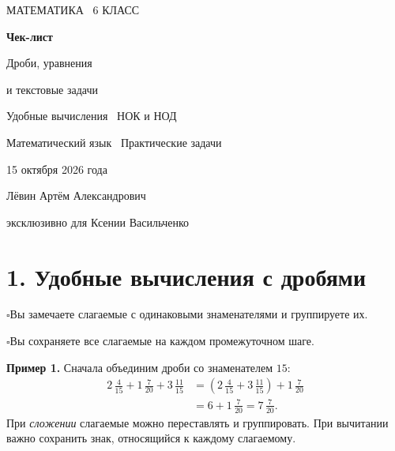 \documentclass[a4paper,12pt]{article}
\newcommand{\sectionline}[1]{\section*{\color{darkaccent}#1}}
\newcommand{\learn}[1]{\par\noindent$\square$\enspace #1\par}
\newcommand{\mix}[3]{#1\,\frac{#2}{#3}}
\begin{document}
\begin{titlepage}
\thispagestyle{empty}
\centering
\vspace*{30mm}
{\color{accent}\large МАТЕМАТИКА \textbullet\ 6 КЛАСС\par}
\vspace{18mm}
{\color{darkaccent}\Huge\bfseries Чек-лист\par}
\vspace{9mm}
{\LARGE Дроби, уравнения\par}
\vspace{2mm}
{\LARGE и текстовые задачи\par}
\vspace{11mm}
{\large Удобные вычисления \textbullet\ НОК и НОД\par}
\vspace{2mm}
{\large Математический язык \textbullet\ Практические задачи\par}
\vspace{18mm}
{\large 15 октября 2026 года\par}
\vfill
{\large Лёвин Артём Александрович\par}
\vspace{3mm}
{\normalsize эксклюзивно для Ксении Васильченко\par}
\vspace{32mm}
\end{titlepage}

\sectionline{1. Удобные вычисления с дробями}
\learn{Вы замечаете слагаемые с одинаковыми знаменателями и группируете их.}
\learn{Вы сохраняете все слагаемые на каждом промежуточном шаге.}

\textbf{Пример 1.} Сначала объединим дроби со знаменателем $15$:
\begin{align*}
\mix{2}{4}{15}+\mix{1}{7}{20}+\mix{3}{11}{15}
&=\left(\mix{2}{4}{15}+\mix{3}{11}{15}\right)+\mix{1}{7}{20}\\
&=6+\mix{1}{7}{20}
=\boxed{\mix{7}{7}{20}}.
\end{align*}
При \emph{сложении} слагаемые можно переставлять и группировать. При вычитании
важно сохранить знак, относящийся к каждому слагаемому.
\end{document}
